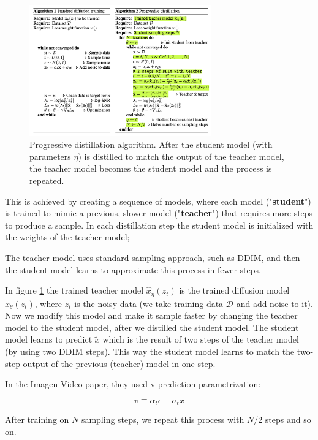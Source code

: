 \begin{figure}
    \centering
    \includegraphics[width=0.7\textwidth]{images/imagen_video/progressive_distillation.png}
    \caption{Progressive distillation algorithm. After the student model (with parameters $\eta$) is distilled to match the output of the teacher model, the teacher model becomes the student model and the process is repeated.}
    \label{fig:progressive_distillation_algorithm}
\end{figure}

This is achieved by creating a sequence of models, where each model ("\textbf{student}") is trained to mimic a previous, slower model ("\textbf{teacher}") that requires more steps to produce a sample. In each distillation step the student model is initialized with the weights of the teacher model; 

The teacher model uses standard sampling approach, such as DDIM, and then the student model learns to approximate this process in fewer steps.

In figure \ref{fig:progressive_distillation_algorithm} the trained teacher model $\hat{x}_{\eta} (z_t)$ is the trained diffusion model $\hat{x}_{\theta} (z_t)$, where $z_t$ is the noisy data (we take training data $\mathcal{D}$ and add noise to it). Now we modify this model and make it sample faster by changing the teacher model to the student model, after we distilled the student model. The student model learns to predict $\tilde{x}$ which is the result of two steps of the teacher model (by using two DDIM steps). This way the student model learns to match the two-step output of the previous (teacher) model in one step.

In the Imagen-Video paper, they used v-prediction parametrization:

\[ v \equiv \alpha_t \epsilon - \sigma_t x \]

After training on $N$ sampling steps, we repeat this process with $N/2$ steps and so on.

